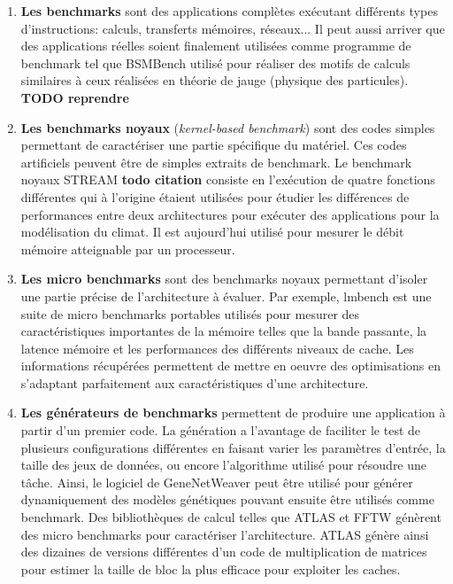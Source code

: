         \begin{enumerate}

            \item  \textbf{Les benchmarks} sont des applications complètes exécutant différents types d'instructions: calculs, transferts mémoires, réseaux... Il peut aussi arriver que des applications réelles soient finalement utilisées comme programme de benchmark tel que BSMBench \cite{HPC:bsmbench} utilisé pour réaliser des motifs de calculs similaires à ceux réalisées en théorie de jauge (physique des particules). \textbf{TODO reprendre}
        
            \item  \textbf{Les benchmarks noyaux} (\textit{kernel-based benchmark}) sont des codes simples permettant de caractériser une partie spécifique du matériel. Ces codes artificiels peuvent être de simples extraits de benchmark. Le benchmark noyaux STREAM \textbf{todo citation} consiste en l'exécution de quatre fonctions différentes qui à l'origine étaient utilisées pour étudier les différences de performances entre deux architectures pour exécuter des applications pour la modélisation du climat. Il est aujourd'hui utilisé pour mesurer le débit mémoire atteignable par un processeur.
        
            \item \textbf{Les micro benchmarks} sont des benchmarks noyaux permettant d’isoler une partie précise de l’architecture à évaluer. Par exemple, lmbench \cite{HPC:lmbench} est une suite de micro benchmarks portables utilisés pour mesurer des caractéristiques importantes de la mémoire telles que la bande passante, la latence mémoire et les performances des différents niveaux de cache.  Les informations récupérées permettent de mettre en oeuvre des optimisations en s'adaptant parfaitement aux caractéristiques d'une architecture.
      
            \item \textbf{Les générateurs de benchmarks} permettent de produire une application à partir d'un premier code. La génération a l'avantage de faciliter le test de plusieurs configurations différentes en faisant varier les paramètres d'entrée, la taille des jeux de données, ou encore l'algorithme utilisé pour résoudre une tâche. Ainsi, le logiciel de GeneNetWeaver \cite{schaffter2011genenetweaver} peut être utilisé pour générer dynamiquement des modèles génétiques pouvant ensuite être utilisés comme benchmark. Des bibliothèques de calcul telles que ATLAS \cite{whaley1998automatically} et FFTW \cite{frigo1998fftw} génèrent des micro benchmarks pour caractériser l'architecture. ATLAS génère ainsi des dizaines de versions différentes d'un code de multiplication de matrices pour estimer la taille de bloc la plus efficace pour exploiter les caches.
        \end{enumerate}    
   
